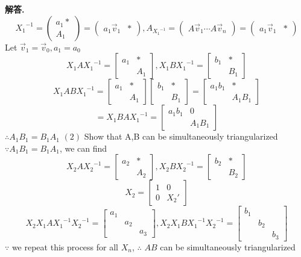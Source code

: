 \documentclass[12pt, a4paper, oneside]{article}
\newenvironment{solution}{\par\noindent\textbf{解答. }}{\par}
\begin{document}
\begin{CJK}{UTF8}{gbsn}
\begin{solution}
  $$ {X_1}^{-1} = \begin{pmatrix}
    a_1* \\ A_1
  \end{pmatrix} = \begin{pmatrix}
    a_1\vec{v}_1 & *
  \end{pmatrix}, A_{{X_1}^{-1}} = \begin{pmatrix}
    A\vec{v}_1 \cdots A\vec{v}_n 
  \end{pmatrix} = \begin{pmatrix}
    a_1\vec{v}_1 & *
  \end{pmatrix} $$
  Let $\vec{v}_1 = \vec{v}_0, a_1 = a_0$ \newline
  $$X_1A{X_1}^{-1} = \begin{bmatrix} a_1 & * \\ & A_1 \end{bmatrix}, X_1B{X_1}^{-1} = \begin{bmatrix} b_1 & * \\ & B_1 \end{bmatrix}$$
  $$ X_1AB{X_1}^{-1} = \begin{bmatrix} a_1 & * \\ & A_1 \end{bmatrix}  \begin{bmatrix} b_1 & * \\ & B_1 \end{bmatrix} =  \begin{bmatrix} a_1b_1 & * \\ & A_1B_1 \end{bmatrix} $$ 
  $$ = X_1BA{X_1}^{-1} = \begin{bmatrix} a_1b_1 & 0\\ & A_1B_1 \end{bmatrix}$$
  $\therefore A_1B_1 = B_1A_1$ \newline
  $(2)$ Show that A,B can be simultaneously triangularized \newline 
  $\because A_1B_1 = B_1A_1$, we can find 
  $$X_2A{X_2}^{-1} = \begin{bmatrix} a_2 & * \\ & A_2 \end{bmatrix}, X_2B{X_2}^{-1} = \begin{bmatrix} b_2 & * \\ & B_2 \end{bmatrix}$$
  $$X_2 = \begin{bmatrix}
    1 & 0 \\ 0 & X_2'
  \end{bmatrix} $$
  $$ X_2X_1A{X_1}^{-1}{X_2}^{-1} = \begin{bmatrix}
    a_1 && \\ &  a_2 & \\ && a_3
  \end{bmatrix},  X_2X_1B{X_1}^{-1}{X_2}^{-1} = \begin{bmatrix}
    b_1 && \\ &  b_2 & \\ && b_3
  \end{bmatrix}$$ 
  $\because$ we repeat this process for all $X_n$, $\therefore$ $AB$ can be simultaneously triangularized
\end{solution}

\end{CJK}
\end{document}

